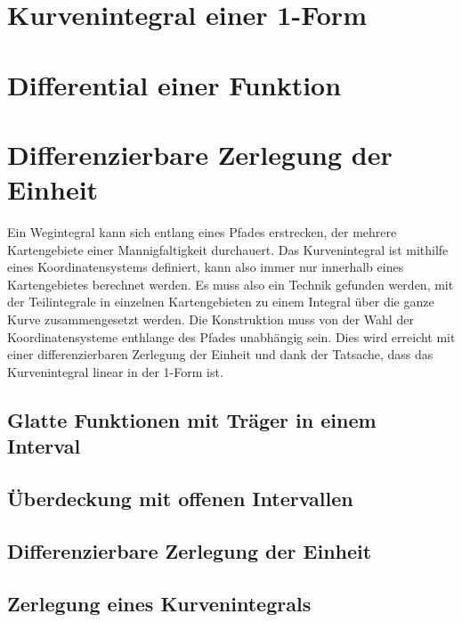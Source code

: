 %
%
\section{Kurvenintegral einer 1-Form}

%
%
\section{Differential einer Funktion}

%
%
\section{Differenzierbare Zerlegung der Einheit}
Ein Wegintegral kann sich entlang eines Pfades erstrecken, der
mehrere Kartengebiete einer Mannigfaltigkeit durchauert.
Das Kurvenintegral ist mithilfe eines Koordinatensystems definiert,
kann also immer nur innerhalb eines Kartengebietes berechnet werden.
Es muss also ein Technik gefunden werden, mit der Teilintegrale in
einzelnen Kartengebieten zu einem Integral über die ganze Kurve
zusammengesetzt werden.
Die Konstruktion muss von der Wahl der Koordinatensysteme enthlange
des Pfades unabhängig sein.
Dies wird erreicht mit einer differenzierbaren Zerlegung der Einheit
und dank der Tatsache, dass das Kurvenintegral linear in der 1-Form
ist.

\subsection{Glatte Funktionen mit Träger in einem Interval}

\subsection{Überdeckung mit offenen Intervallen}

\subsection{Differenzierbare Zerlegung der Einheit}

\subsection{Zerlegung eines Kurvenintegrals}



